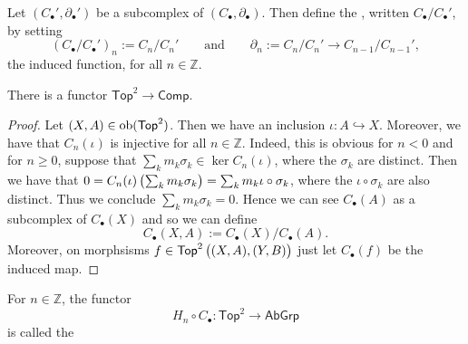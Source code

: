 \begin{definition}
	Let $(C_\bullet',\partial_\bullet')$ be a subcomplex of $(C_\bullet,\partial_\bullet)$. Then define the , written $C_\bullet/C_\bullet'$, by setting
	\begin{equation*}
		(C_\bullet/C_\bullet')_n := C_n/C_n' \qquad \text{and} \qquad \partial_n := C_n/C_n' \to C_{n - 1}/C_{n - 1}',
	\end{equation*}
	\noindent the induced function, for all $n \in \mathbb{Z}$.
\end{definition}

\begin{proposition}
	There is a functor $\mathsf{Top}^2 \to \mathsf{Comp}$.
\end{proposition}

\begin{proof}
	Let $(X,A) \in \operatorname{ob}(\mathsf{Top}^2)$. Then we have an inclusion $\iota : A \hookrightarrow X$. Moreover, we have that $C_n(\iota)$ is injective for all $n \in \mathbb{Z}$. Indeed, this is obvious for $n < 0$ and for $n \geq 0$, suppose that $\sum_k m_k \sigma_k \in \ker C_n(\iota)$, where the $\sigma_k$ are distinct. Then we have that $0 = C_n(\iota)\del[1]{\sum_k m_k \sigma_k} = \sum_k m_k \iota \circ \sigma_k$, where the $\iota \circ \sigma_k$ are also distinct. Thus we conclude $\sum_k m_k \sigma_k = 0$. Hence we can see $C_\bullet(A)$ as a subcomplex of $C_\bullet(X)$ and so we can define
	\begin{equation*}
		C_\bullet(X,A) := C_\bullet(X)/C_\bullet(A).
	\end{equation*}
	Moreover, on morphsisms $f \in \mathsf{Top}^2\del[1]{(X,A),(Y,B)}$ just let $C_\bullet(f)$ be the induced map.
\end{proof}

\begin{definition}
	For $n \in \mathbb{Z}$, the functor 
	\begin{equation}
		H_n \circ C_\bullet : \mathsf{Top}^2 \to \mathsf{AbGrp}
	\end{equation}
	\noindent is called the 
\end{definition}
